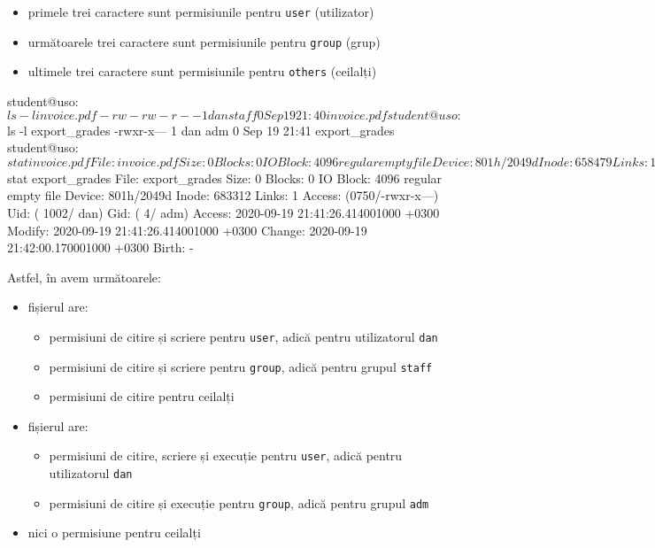 \begin{itemize}
  \item primele trei caractere sunt permisiunile pentru \texttt{user} (utilizator)
  \item următoarele trei caractere sunt permisiunile pentru \texttt{group} (grup)
  \item ultimele trei caractere sunt permisiunile pentru \texttt{others} (ceilalți)
\end{itemize}

\begin{screen}[caption={Listare permisiuni pe fișiere},label={lst:user:list-perm}]
student@uso:~$ ls -l invoice.pdf
-rw-rw-r-- 1 dan staff 0 Sep 19 21:40 invoice.pdf
student@uso:~$ ls -l export_grades
-rwxr-x--- 1 dan adm 0 Sep 19 21:41 export_grades
student@uso:~$ stat invoice.pdf
  File: invoice.pdf
  Size: 0         	Blocks: 0          IO Block: 4096   regular empty file
Device: 801h/2049d	Inode: 658479      Links: 1
Access: (0664/-rw-rw-r--)  Uid: ( 1002/     dan)   Gid: (   50/   staff)
Access: 2020-09-19 21:40:40.242001000 +0300
Modify: 2020-09-19 21:40:40.242001000 +0300
Change: 2020-09-19 21:41:55.110001000 +0300
 Birth: -
student@uso:~$ stat export_grades
  File: export_grades
  Size: 0         	Blocks: 0          IO Block: 4096   regular empty file
Device: 801h/2049d	Inode: 683312      Links: 1
Access: (0750/-rwxr-x---)  Uid: ( 1002/     dan)   Gid: (    4/     adm)
Access: 2020-09-19 21:41:26.414001000 +0300
Modify: 2020-09-19 21:41:26.414001000 +0300
Change: 2020-09-19 21:42:00.170001000 +0300
 Birth: -
\end{screen}

Astfel, în  avem următoarele:

\begin{itemize}
  \item fișierul  are:
    \begin{itemize}
      \item permisiuni de citire și scriere pentru \texttt{user}, adică pentru utilizatorul \texttt{dan}
      \item permisiuni de citire și scriere pentru \texttt{group}, adică pentru grupul \texttt{staff}
      \item permisiuni de citire pentru ceilalți
    \end{itemize}
  \item fișierul  are:
    \begin{itemize}
      \item permisiuni de citire, scriere și execuție pentru \texttt{user}, adică pentru utilizatorul \texttt{dan}
      \item permisiuni de citire și execuție pentru \texttt{group}, adică pentru grupul \texttt{adm}
    \end{itemize}
  \item nici o permisiune pentru ceilalți
\end{itemize}

